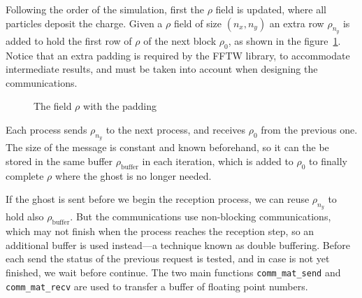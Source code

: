 Following the order of the simulation, first the $\rho$ field is updated, where 
all particles deposit the charge. Given a $\rho$ field of size $(n_x, n_y)$ an 
extra row $\rho_{n_y}$ is added to hold the first row of $\rho$ of the next 
block $\rho_0$, as shown in the figure~\ref{fig:field_rho}. Notice that an extra 
padding is required by the FFTW library, to accommodate intermediate results, 
and must be taken into account when designing the communications.
%
\begin{figure}[ht]
\centering
{}
\caption{The field $\rho$ with the padding}
\label{fig:field_rho}
\end{figure}

Each process sends $\rho_{n_y}$ to the next process, and receives $\rho_0$ from 
the previous one. The size of the message is constant and known beforehand, so 
it can the be stored in the same buffer $\rho_\text{buffer}$ in each iteration, 
which is added to $\rho_0$ to finally complete $\rho$ where the ghost is no 
longer needed.

If the ghost is sent before we begin the reception process, we can reuse 
$\rho_{n_y}$ to hold also $\rho_\text{buffer}$. But the communications use 
non-blocking communications, which may not finish when the process reaches the 
reception step, so an additional buffer is used instead---a technique known as 
double buffering.  Before each send the status of the previous request is 
tested, and in case is not yet finished, we wait before continue. The two main 
functions \texttt{comm\_mat\_send} and \texttt{comm\_mat\_recv} are used to 
transfer a buffer of floating point numbers.

